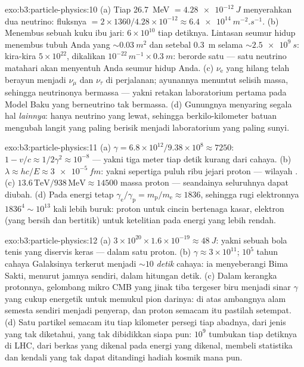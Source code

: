 \begin{solution}{exo:b3:particle-physics:10}
(a) Tiap \qty{26.7}{MeV} $= \qty{4.28e-12}{J}$ menyerahkan dua
neutrino: fluksnya $= 2\times1360/4.28\times10^{-12} \approx
\qty{6.4e14}{m^{-2}.s^{-1}}$. (b) Menembus sebuah kuku ibu jari:
$6\times10^{10}$ tiap detiknya. Lintasan seumur hidup menembus tubuh Anda
yang ${\sim}\qty{0.03}{m^2}$ dan setebal \qty{0.3}{m} selama
${\sim}\qty{2.5e9}{s}$: kira-kira $5\times10^{22}$, dikalikan
$10^{-22}\,\unit{m^{-1}}\times\qty{0.3}{m}$: berorde satu ---
satu neutrino matahari akan menyentuh Anda seumur hidup Anda. (c)
$\nu_{\text{e}}$ yang hilang telah berayun menjadi $\nu_\mu$ dan
$\nu_\tau$ di perjalanan; ayunannya menuntut selisih massa, sehingga
neutrinonya bermassa --- yakni retakan laboratorium pertama pada Model
Baku yang berneutrino tak bermassa. (d) Gunungnya menyaring
segala hal \emph{lainnya}: hanya neutrino yang lewat, sehingga berkilo-kilometer
batuan mengubah langit yang paling berisik menjadi laboratorium yang paling sunyi.
\end{solution}

\begin{solution}{exo:b3:particle-physics:11}
(a) $\gamma = 6.8\times10^{12}/9.38\times10^{8} \approx 7250$:
$1 - v/c \approx 1/2\gamma^2 \approx 10^{-8}$ --- yakni tiga meter
tiap detik kurang dari cahaya. (b) $\lambda \approx hc/E \approx
\qty{3e-5}{fm}$: yakni sepertiga puluh ribu jejari proton --- wilayah
. (c) $13.6\,\text{TeV}/938\,\text{MeV} \approx
14500$ massa proton --- seandainya seluruhnya dapat diubah. (d) Pada
energi tetap $\gamma_{\text{e}}/\gamma_{\text{p}} =
m_{\text{p}}/m_{\text{e}} \approx 1836$, sehingga rugi elektronnya
$1836^4 \sim 10^{13}$ kali lebih buruk: proton untuk cincin bertenaga kasar,
elektron (yang bersih dan bertitik) untuk ketelitian pada energi yang lebih rendah.
\end{solution}

\begin{solution}{exo:b3:particle-physics:12}
(a) $3\times10^{20}\times1.6\times10^{-19} \approx \qty{48}{J}$:
yakni sebuah bola tenis yang diservis keras --- dalam satu proton. (b) $\gamma \approx
3\times10^{11}$; $10^{5}$ tahun cahaya Galaksinya terkerut menjadi
${\sim}10$ \emph{detik} cahaya: ia menyeberangi Bima Sakti, menurut
jamnya sendiri, dalam hitungan detik. (c) Dalam kerangka protonnya, gelombang
mikro CMB yang jinak tiba tergeser biru menjadi sinar $\gamma$ yang cukup
energetik untuk memukul pion darinya: di atas ambangnya alam semesta
sendiri menjadi penyerap, dan proton semacam itu pastilah setempat. (d) Satu
partikel semacam itu tiap kilometer persegi tiap abadnya, dari jenis yang tak diketahui,
yang tak dibidikkan siapa pun: $10^{9}$ tumbukan tiap detiknya di LHC,
dari berkas yang dikenal pada energi yang dikenal, membeli statistika dan
kendali yang tak dapat ditandingi hadiah kosmik mana pun.
\end{solution}

